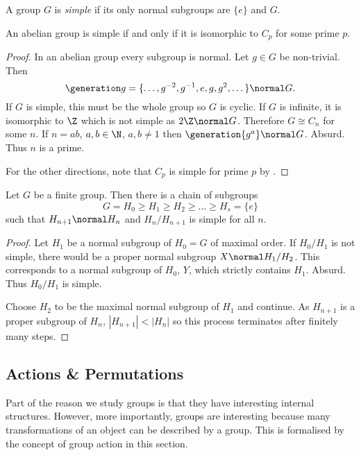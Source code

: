 \documentclass[a4paper]{article}
\begin{document}
\begin{definition}
  A group \(G\) is \emph{simple} if its only normal subgroups are \(\{e\}\) and \(G\).
\end{definition}

\begin{lemma}
  An abelian group is simple if and only if it is isomorphic to \(C_p\) for some prime \(p\).
\end{lemma}

\begin{proof}
  In an abelian group every subgroup is normal. Let \(g \in G\) be non-trivial. Then
  \[
    \generation g = \{\dots, g^{-2}, g^{-1}, e, g, g^2, \dots\} \normal G.
  \]
  If \(G\) is simple, this must be the whole group so \(G\) is cyclic. If \(G\) is infinite, it is isomorphic to \(\Z\) which is not simple as \(2\Z \normal G\). Therefore \(G \cong C_n\) for some \(n\). If \(n = ab\), \(a, b \in \N\), \(a, b \neq 1\) then \(\generation{g^a} \normal G\). Absurd. Thus \(n\) is a prime.

  For the other directions, note that \(C_p\) is simple for prime \(p\) by .
\end{proof}

\begin{theorem}
  Let \(G\) be a finite group. Then there is a chain of subgroups
  \[
    G = H_0 \geq H_1 \geq H_2 \geq \dots \geq H_s = \{e\}
  \]
  such that \(H_{n + 1} \normal H_n\) and \(H_n/H_{n + 1}\) is simple for all \(n\).
\end{theorem}

\begin{proof}
  Let \(H_1\) be a normal subgroup of \(H_0 = G\) of maximal order. If \(H_0/H_1\) is not simple, there would be a proper normal subgroup \(X \normal H_1/H_2\). This corresponds to a normal subgroup of \(H_0\), \(Y\), which strictly contains \(H_1\). Absurd. Thus \(H_0/H_1\) is simple.

  Choose \(H_2\) to be the maximal normal subgroup of \(H_1\) and continue. As \(H_{n + 1}\) is a proper subgroup of \(H_n\), \(|H_{n + 1}| < |H_n|\) so this process terminates after finitely many steps.
\end{proof}

\subsection{Actions \& Permutations}

Part of the reason we study groups is that they have interesting internal structures. However, more importantly, groups are interesting because many transformations of an object can be described by a group. This is formalised by the concept of group action in this section.
\end{document}
